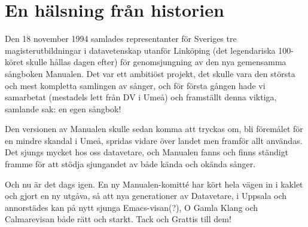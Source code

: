 \documentclass[a6paper,fontsize=10pt,twoside,open=right]{scrbook}
\begin{document}
\par
\vspace{10pt}
\vfill
\null
\newpage

\newpage

\newpage

\vspace*{-10pt}
\newpage

\newpage

\vspace*{-10pt}
\newpage

\newpage

\vspace*{-11pt}
\newpage

\vspace{15pt}

\newpage

\vspace{15pt}

\vspace*{-10pt}
\newpage

\newpage

\newpage

\newpage

\vspace*{-10pt}
\newpage

\newpage

\newpage
{}
\section{En hälsning från historien}\vspace{10pt}
\setlength{\parindent}{15pt}
\noindent\hspace{15pt}Den 18 november 1994 samlades representanter för
Sveriges tre magisterutbildningar i datavetenskap utanför Linköping
(det legendariska 100-köret skulle hållas dagen efter) för
genomsjungning av den nya gemensamma sångboken Manualen. Det var ett
ambitiöst projekt, det skulle vara den största och mest kompletta
samlingen av sånger, och för första gången hade vi samarbetat
(mestadels lett från DV i Umeå) och framställt denna viktiga, samlande
sak: en egen sångbok!

Den versionen av Manualen skulle sedan komma
att tryckas om, bli föremålet för en mindre skandal i Umeå, spridas
vidare över landet men framför allt användas. Det sjungs mycket hos
oss datavetare, och Manualen fanns och finns ständigt framme för att
stödja sjungandet av både kända och okända sånger.

Och nu är det dags igen. En ny Manualen-komitté
har kört hela vägen in i kaklet och gjort en ny utgåva, så att nya
generationer av Datavetare, i Uppsala och annorstädes kan på nytt
sjunga Emacs-visan(?), O Gamla Klang och Calmarevisan både rätt och
starkt. Tack och Grattis till dem!
\end{document}

